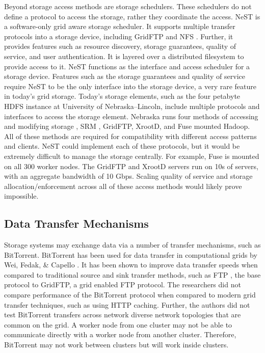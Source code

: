 Beyond storage access methods are storage schedulers.  These schedulers do not define a protocol to access the storage, rather they coordinate the access.  NeST \cite{bent2002flexibility} is a software-only grid aware storage scheduler.  It supports multiple transfer protocols into a storage device, including GridFTP \cite{allcock2005globus} and NFS \cite{walsh1985overview}.  Further, it provides features such as resource discovery, storage guarantees, quality of service, and user authentication.  It is layered over a distributed filesystem to provide access to it.  NeST functions as the interface and access scheduler for a storage device.  Features such as the storage guarantees and quality of service require NeST to be the only interface into the storage device, a very rare feature in today's grid storage.  Today's storage elements, such as the four petabyte HDFS instance at University of Nebraska--Lincoln, include multiple protocols and interfaces to access the storage element.  Nebraska runs four methods of accessing and modifying storage \cite{attebury2009hadoop}, SRM \cite{shoshani2002storage}, GridFTP, XrootD, and Fuse \cite{szeredi2010fuse} mounted Hadoop.  All of these methods are required for compatibility with different access patterns and clients.  NeST could implement each of these protocols, but it would be extremely difficult to manage the storage centrally.  For example, Fuse is mounted on all 300 worker nodes.  The GridFTP and XrootD servers run on 10s of servers, with an aggregate bandwidth of 10 Gbps.  Scaling quality of service and storage allocation/enforcement across all of these access methods would likely prove impossible.

\subsection{Data Transfer Mechanisms}

Storage systems may exchange data via a number of transfer mechanisms, such as BitTorrent.  BitTorrent has been used for data transfer in computational grids by Wei, Fedak, \& Capello \cite{wei2005collaborative, wei2005scheduling, wei2007towards}.  It has been shown to improve data transfer speeds when compared to traditional source and sink transfer methods, such as FTP \cite{postel1985file}, the base protocol to GridFTP, a grid enabled FTP protocol.  The researchers did not compare performance of the BitTorrent protocol when compared to modern grid transfer techniques, such as using HTTP caching.  Further, the authors did not test BitTorrent transfers across network diverse network topologies that are common on the grid.  A worker node from one cluster may not be able to communicate directly with a worker node from another cluster.  Therefore, BitTorrent may not work between clusters but will work inside clusters.

